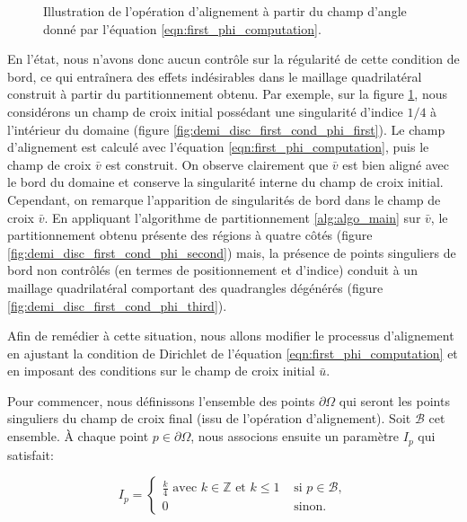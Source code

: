 \begin{figure}[!h]
\caption{Illustration de l'opération d'alignement à partir du champ d'angle donné par l'équation \eqref{eqn:first_phi_computation}.}
\label{fig:demi_disc_first_cond_phi}
\end{figure}

En l'état, nous n'avons donc aucun contrôle sur la régularité de cette condition de bord, ce qui entraînera des effets indésirables dans le maillage quadrilatéral construit à partir du partitionnement obtenu. Par exemple, sur la figure \ref{fig:demi_disc_first_cond_phi}, nous considérons un champ de croix initial possédant une singularité d'indice $1/4$ à l'intérieur du domaine (figure \ref{fig:demi_disc_first_cond_phi_first}). Le champ d'alignement est calculé avec l'équation \eqref{eqn:first_phi_computation}, puis le champ de croix $\bar{v}$ est construit. On observe clairement que $\bar{v}$ est bien aligné avec le bord du domaine et conserve la singularité interne du champ de croix initial. Cependant, on remarque l'apparition de singularités de bord dans le champ de croix $\bar{v}$. En appliquant l'algorithme de partitionnement \ref{alg:algo_main} sur $\bar{v}$, le partitionnement obtenu présente des régions à quatre côtés (figure \ref{fig:demi_disc_first_cond_phi_second}) mais, la présence de points singuliers de bord non contrôlés (en termes de positionnement et d'indice) conduit à un maillage quadrilatéral comportant des quadrangles dégénérés (figure \ref{fig:demi_disc_first_cond_phi_third}).


Afin de remédier à cette situation, nous allons modifier le processus d'alignement en ajustant la condition de Dirichlet de l'équation \eqref{eqn:first_phi_computation} et en imposant des conditions sur le champ de croix initial $\bar{u}$.

Pour commencer, nous définissons l'ensemble des points $\partial\Omega$ qui seront les points singuliers du champ de croix final (issu de l'opération d'alignement). Soit $\mathcal{B}$ cet ensemble. À chaque point $p\in\partial\Omega$, nous associons ensuite un paramètre $I_p$ qui satisfait:

\begin{equation}
I_p=
\left\{
\begin{array}{ll}
    \displaystyle\frac{k}{4}\mbox{ avec }k\in\mathbb{Z}\mbox{ et }k\leq 1&\mbox{ si }p\in\mathcal{B},\\[0.5cm]
    0&\mbox{ sinon}.
\end{array}
\right.
\label{eqn:hyp_I_p}
\end{equation}

